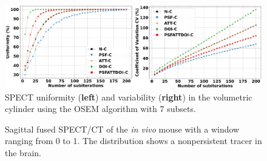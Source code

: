 \documentclass[utf8]{FrontiersinVancouver}
\begin{document}
\begin{figure}[ht!]
\begin{center}
\includegraphics[width=\linewidth]{Figures/Uniformity_Variability}
\end{center}
\caption{SPECT uniformity (\textbf{left}) and variability (\textbf{right}) in the volumetric cylinder using the OSEM algorithm with 7 subsets.}\label{fig:uniformity_variability}
\end{figure}




\begin{figure}[ht!]
\begin{center}
\end{center}
\caption{Sagittal fused SPECT/CT of the \textit{in vivo} mouse with a window ranging from 0 to 1. The  distribution shows a nonpersistent tracer in the brain.}\label{fig:invivo}
\end{figure}
\end{document}
